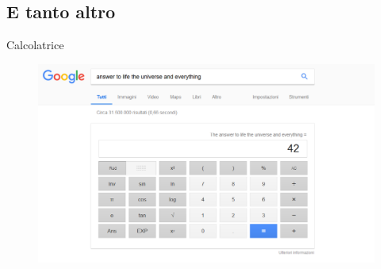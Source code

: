 \documentclass{beamer}
\begin{document}
\subsection{E tanto altro}
\begin{frame}{Calcolatrice}
\begin{figure}[h!]
\includegraphics[width=\linewidth]{immagini/calc.png}
\end{figure}
\end{frame}
\end{document}
